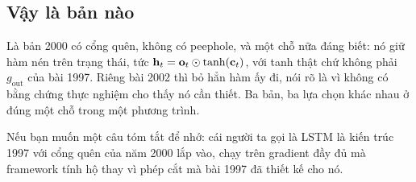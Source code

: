 \subsection*{Vậy  là bản nào}

%
Là bản 2000 có cổng quên, không có peephole, và một chỗ nữa đáng biết: nó giữ
hàm nén trên trạng thái, tức \(\mathbf{h}_t = \mathbf{o}_t \odot \tanh(\mathbf{c}_t)\),
với tanh thật chứ không phải \(g_{\mathrm{out}}\) của bài 1997. Riêng bài 2002
thì bỏ hẳn hàm ấy đi, nói rõ là vì không có bằng chứng thực nghiệm cho thấy nó
cần thiết. Ba bản, ba lựa chọn khác nhau ở đúng một chỗ trong một phương trình.

Nếu bạn muốn một câu tóm tắt để nhớ: cái người ta gọi là LSTM là kiến trúc
1997 với cổng quên của năm 2000 lắp vào, chạy trên gradient đầy đủ mà framework
tính hộ thay vì phép cắt mà bài 1997 đã thiết kế cho nó.

